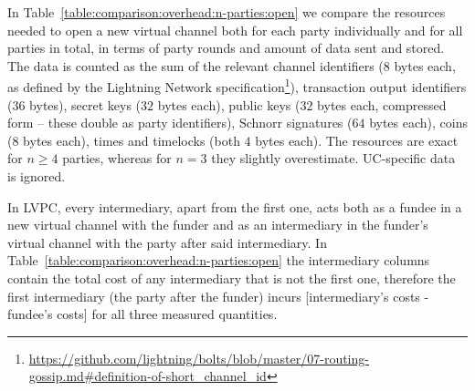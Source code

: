   In Table~\ref{table:comparison:overhead:n-parties:open} we compare the
  resources needed to open a new virtual channel both for each party
  individually and for all parties in total, in terms of party rounds and amount
  of data sent and stored. The data is counted as the sum of the relevant
  channel identifiers ($8$ bytes each, as defined by the Lightning Network
  specification\footnote{\url{https://github.com/lightning/bolts/blob/master/07-routing-gossip.md\#definition-of-short_channel_id}}),
  transaction output identifiers ($36$ bytes), secret keys ($32$ bytes each),
  public keys ($32$ bytes each, compressed form -- these double as party
  identifiers), Schnorr signatures ($64$ bytes each), coins ($8$ bytes each),
  times and timelocks (both $4$ bytes each). The resources are exact for $n \geq
  4$ parties, whereas for $n = 3$ they slightly overestimate. UC-specific data
  is ignored.

  In LVPC, every intermediary, apart from the first one, acts both as a fundee
  in a new virtual channel with the funder and as an intermediary in the
  funder's virtual channel with the party after said intermediary. In
  Table~\ref{table:comparison:overhead:n-parties:open} the intermediary columns
  contain the total cost of any intermediary that is not the first one,
  therefore the first intermediary (the party after the funder) incurs
  [intermediary's costs - fundee's costs] for all three measured quantities.

